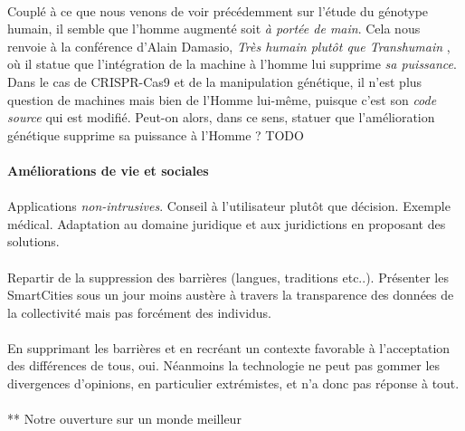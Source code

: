 \paragraph{} Couplé à ce que nous venons de voir précédemment sur l'étude du génotype humain, il semble que
l'homme augmenté soit \emph{à portée de main}. Cela nous renvoie à la conférence d'Alain Damasio, \emph{Très humain
plutôt que Transhumain} \cite{Damasio2}, où il statue que l'intégration de la machine à l'homme lui supprime \emph{
sa puissance}. Dans le cas de CRISPR-Cas9 et de la manipulation génétique, il n'est plus question de machines
mais bien de l'Homme lui-même, puisque c'est son \emph{code source} qui est modifié. Peut-on alors, dans ce sens,
statuer que l'amélioration génétique supprime sa puissance à l'Homme ? TODO

\paragraph{Améliorations de vie et sociales}

\paragraph{} Applications \emph{non-intrusives}. Conseil à l'utilisateur plutôt que décision. Exemple médical.
Adaptation au domaine juridique et aux juridictions en proposant des solutions.

\paragraph{} Repartir de la suppression des barrières (langues, traditions etc..). Présenter les SmartCities sous
un jour moins austère à travers la transparence des données de la collectivité mais pas forcément des individus.

\paragraph{} En supprimant les barrières et en recréant un contexte favorable à l'acceptation des différences de tous,
oui. Néanmoins la technologie ne peut pas gommer les divergences d'opinions, en particulier extrémistes, et n'a donc
pas réponse à tout.

\paragraph{} 

** Notre ouverture sur un monde meilleur

